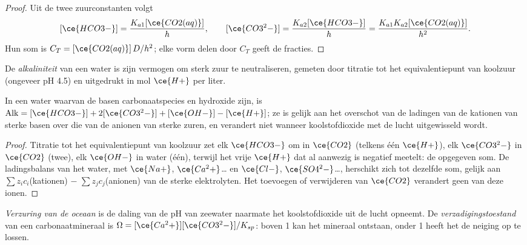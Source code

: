 \begin{proof}
Uit de twee zuurconstanten volgt
\[
  [\ce{HCO3-}] = \frac{K_{a1}[\ce{CO2(aq)}]}{h}, \qquad [\ce{CO3^2-}] = \frac{K_{a2}[\ce{HCO3-}]}{h} = \frac{K_{a1}K_{a2}[\ce{CO2(aq)}]}{h^2}.
\]
Hun som is $C_T = [\ce{CO2(aq)}]\,D/h^2$; elke vorm delen door $C_T$ geeft de fracties.
\end{proof}

\begin{definition}[Alkaliniteit]\label{def:b3:environmental-toxicology:alkalinity}
De \emph{alkaliniteit} van een water is zijn vermogen
om sterk zuur te neutraliseren, gemeten door titratie tot het
equivalentiepunt van koolzuur (ongeveer pH
4.5) en uitgedrukt in mol $\ce{H+}$ per liter.
\end{definition}

\begin{proposition}[Carbonaatalkaliniteit]\label{prop:b3:environmental-toxicology:alkalinity}
In een water waarvan de basen carbonaatspecies en hydroxide zijn, is
$\mathrm{Alk} = [\ce{HCO3-}] + 2[\ce{CO3^2-}] + [\ce{OH-}] - [\ce{H+}]$; ze is gelijk aan het overschot van de ladingen van de kationen
van sterke basen over die van de anionen van sterke zuren, en verandert
niet wanneer koolstofdioxide met de lucht uitgewisseld wordt.
\end{proposition}

\begin{proof}
Titratie tot het equivalentiepunt van koolzuur zet elk $\ce{HCO3-}$ om in $\ce{CO2}$ (telkens één $\ce{H+}$),
elk $\ce{CO3^2-}$ in $\ce{CO2}$ (twee), elk $\ce{OH-}$ in water (één), terwijl het vrije $\ce{H+}$ dat al aanwezig is
negatief meetelt: de opgegeven som. De ladingsbalans van het water, met
$\ce{Na+}$, $\ce{Ca^2+}$\dots{} en $\ce{Cl-}$, $\ce{SO4^2-}$\dots, herschikt zich tot dezelfde som, gelijk aan $\sum z_i c_i$(kationen) $-$ $\sum z_jc_j$(anionen)
van de sterke elektrolyten. Het toevoegen of verwijderen van $\ce{CO2}$ verandert geen
van deze ionen.
\end{proof}

\begin{definition}\label{def:b3:environmental-toxicology:acidification}
\emph{Verzuring van de oceaan} is de daling
van de pH van zeewater naarmate het koolstofdioxide uit de lucht opneemt.
De \emph{verzadigingstoestand} van een
carbonaatmineraal is
$\Omega = [\ce{Ca^2+}][\ce{CO3^2-}]/K_{sp}$: boven 1 kan het mineraal ontstaan, onder 1 heeft het de neiging op te lossen.
\end{definition}

